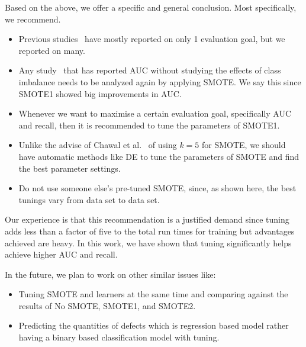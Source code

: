 \documentclass[sigconf,review, anonymous]{acmart}
\newcommand{\bi}{\begin{itemize}[leftmargin=0.4cm]}
\newcommand{\ei}{\end{itemize}}
\theoremstyle{break}
\theoremstyle{break}
\begin{document}
Based on the above, we offer a specific and general conclusion. Most specifically, we recommend.
\bi
 \item Previous studies~\cite{ghotra2015revisiting,tantithamthavorn2016automated} have mostly reported on only 1 evaluation goal, but we reported on many.
 \item Any study~\cite{ghotra2015revisiting} that has reported AUC without studying the effects of class imbalance needs to be analyzed again by applying SMOTE. We say this since SMOTE1 showed big improvements in AUC.
 \item Whenever we want to maximise a certain evaluation goal, specifically AUC and recall, then it is recommended to tune the parameters of SMOTE1.
 \item Unlike the advise of Chawal et al.~\cite{chawla2002smote} of using $k=5$ for SMOTE, we should have automatic methods like DE to tune the parameters of SMOTE and find the best parameter settings.
 \item Do not use someone else's pre-tuned SMOTE, since, as shown here, the best tunings vary from data set to data set.
\ei

Our experience is that this recommendation is a justified demand since tuning adds less than a factor of five to the total run times for training but advantages achieved are heavy. In this work, we have shown that tuning significantly helps achieve higher AUC and recall.

In the future, we plan to work on other similar issues like:
\bi
 \item Tuning SMOTE and learners at the same time and comparing against the results of No SMOTE, SMOTE1, and SMOTE2.
 \item Predicting the quantities of defects which is regression based model rather having a binary based classification model with tuning.
\ei

\balance


\medskip

\end{document}
